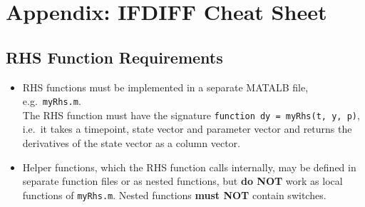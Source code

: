 \section*{Appendix: IFDIFF Cheat Sheet}
\subsection*{RHS Function Requirements}
\begin{itemize}
	\item RHS functions must be implemented in a separate MATALB file, e.g.~\texttt{myRhs.m}. \\
	The RHS function must have the signature \lstinline|function dy = myRhs(t, y, p)|, i.e.~it takes a timepoint, state vector and parameter vector and returns the derivatives of the state vector as a column vector.
	\item Helper functions, which the RHS function calls internally, may be defined in separate function files or as nested functions, but \textbf{do NOT} work as local functions of \texttt{myRhs.m}. Nested functions \textbf{must NOT} contain switches.
\end{itemize}



